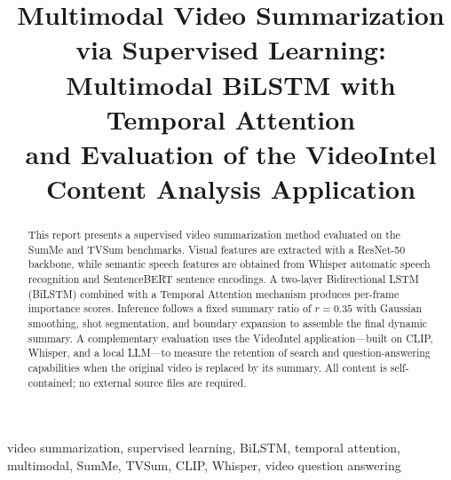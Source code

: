 \documentclass[10pt,conference]{IEEEtran}
\begin{document}
\title{Multimodal Video Summarization via Supervised Learning:\\
Multimodal BiLSTM with Temporal Attention\\
{\large and Evaluation of the VideoIntel Content Analysis Application}}

\author{
  \and
}

\maketitle

\begin{abstract}
This report presents a supervised video summarization method evaluated on the
SumMe and TVSum benchmarks. Visual features are extracted with a ResNet-50
backbone, while semantic speech features are obtained from Whisper automatic
speech recognition and SentenceBERT sentence encodings. A two-layer
Bidirectional LSTM (BiLSTM) combined with a Temporal Attention mechanism
produces per-frame importance scores. Inference follows a fixed summary ratio
of $r{=}0.35$ with Gaussian smoothing, shot segmentation, and boundary
expansion to assemble the final dynamic summary. A complementary evaluation
uses the VideoIntel application---built on CLIP, Whisper, and a local
LLM---to measure the retention of search and question-answering capabilities
when the original video is replaced by its summary. All content is
self-contained; no external source files are required.
\end{abstract}

\begin{IEEEkeywords}
video summarization, supervised learning, BiLSTM, temporal attention,
multimodal, SumMe, TVSum, CLIP, Whisper, video question answering
\end{IEEEkeywords}

\end{document}
